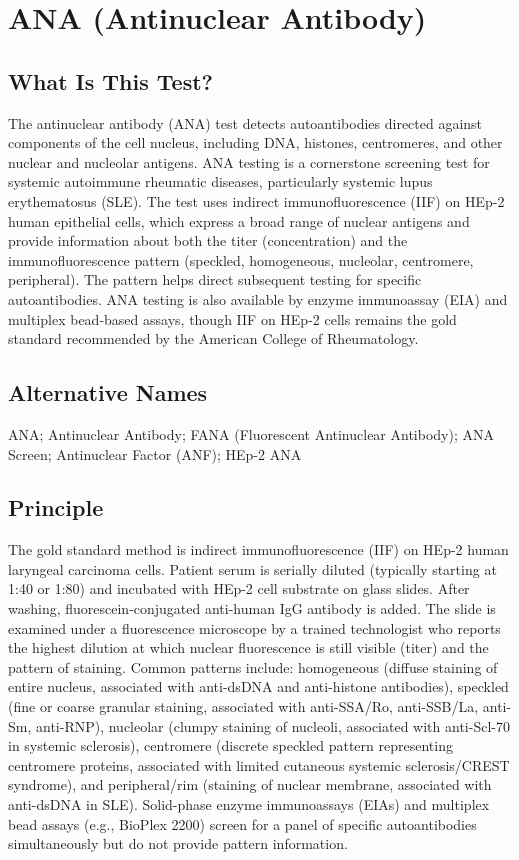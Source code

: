 \chapter{ANA (Antinuclear Antibody)}

\section*{What Is This Test?}
The antinuclear antibody (ANA) test detects autoantibodies directed against components of the cell nucleus, including DNA, histones, centromeres, and other nuclear and nucleolar antigens. ANA testing is a cornerstone screening test for systemic autoimmune rheumatic diseases, particularly systemic lupus erythematosus (SLE). The test uses indirect immunofluorescence (IIF) on HEp-2 human epithelial cells, which express a broad range of nuclear antigens and provide information about both the titer (concentration) and the immunofluorescence pattern (speckled, homogeneous, nucleolar, centromere, peripheral). The pattern helps direct subsequent testing for specific autoantibodies. ANA testing is also available by enzyme immunoassay (EIA) and multiplex bead-based assays, though IIF on HEp-2 cells remains the gold standard recommended by the American College of Rheumatology.

\section*{Alternative Names}
ANA; Antinuclear Antibody; FANA (Fluorescent Antinuclear Antibody); ANA Screen; Antinuclear Factor (ANF); HEp-2 ANA

\section*{Principle}
The gold standard method is indirect immunofluorescence (IIF) on HEp-2 human laryngeal carcinoma cells. Patient serum is serially diluted (typically starting at 1:40 or 1:80) and incubated with HEp-2 cell substrate on glass slides. After washing, fluorescein-conjugated anti-human IgG antibody is added. The slide is examined under a fluorescence microscope by a trained technologist who reports the highest dilution at which nuclear fluorescence is still visible (titer) and the pattern of staining. Common patterns include: homogeneous (diffuse staining of entire nucleus, associated with anti-dsDNA and anti-histone antibodies), speckled (fine or coarse granular staining, associated with anti-SSA/Ro, anti-SSB/La, anti-Sm, anti-RNP), nucleolar (clumpy staining of nucleoli, associated with anti-Scl-70 in systemic sclerosis), centromere (discrete speckled pattern representing centromere proteins, associated with limited cutaneous systemic sclerosis/CREST syndrome), and peripheral/rim (staining of nuclear membrane, associated with anti-dsDNA in SLE). Solid-phase enzyme immunoassays (EIAs) and multiplex bead assays (e.g., BioPlex 2200) screen for a panel of specific autoantibodies simultaneously but do not provide pattern information.

